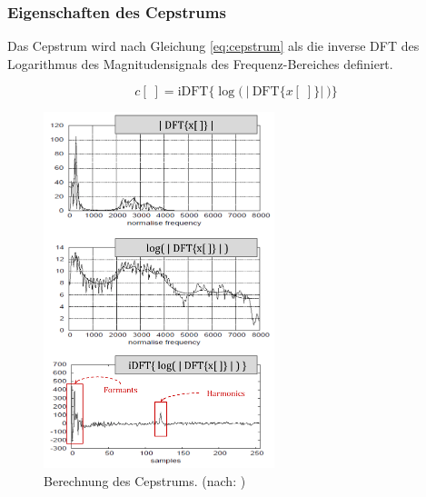 \subsubsection{Eigenschaften des Cepstrums}
\label{sec:vad_ceps_features}

Das Cepstrum wird nach Gleichung \ref{eq:cepstrum} als die inverse DFT des Logarithmus des Magnitudensignals des Frequenz-Bereiches definiert.\cite[Cepstral analysis]{ricardo_ceps}

\begin{equation}
c[\;] =  \text{iDFT}\Big\{ \log \Big(\ \big|\ \text{DFT}\{x[\;]\} \big|\ \Big) \Big\}
\label{eq:cepstrum}
\end{equation}	

\begin{figure}[H]
	\centering
	\includegraphics[width=0.6\textwidth]{bilder/cepstrum04.png}
	\caption{Berechnung des Cepstrums. (nach: \cite[Cepstral Analysis, S. 3]{ricardo_ceps})}
	\label{img:cepstrumOverview}
\end{figure}

